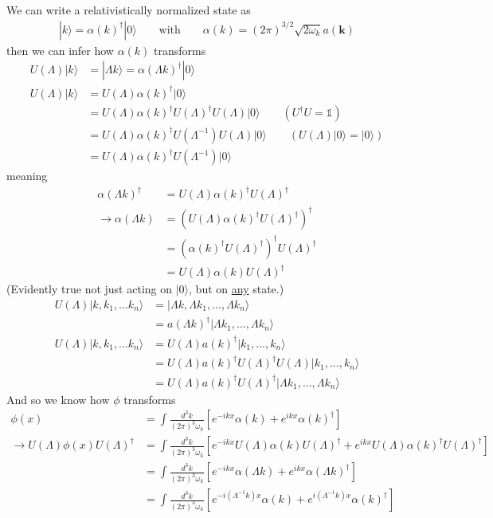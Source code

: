 \documentclass{article}
\begin{document}
We can write a relativistically normalized state as
\begin{align}
|k\rangle=\alpha(k)^\dagger |0\rangle\qquad\text{with}\qquad\alpha(k)=(2\pi)^{3/2}\sqrt{2\omega_k}a(\mathbf{k})
\end{align}
then we can infer how $\alpha(k)$ transforms
\begin{align}
U(\Lambda)|k\rangle&=|\Lambda k\rangle=\alpha(\Lambda k)^\dagger|0\rangle\\
U(\Lambda)|k\rangle
&=U(\Lambda)\alpha(k)^\dagger|0\rangle\\
&=U(\Lambda)\alpha(k)^\dagger U(\Lambda)^\dagger U(\Lambda)|0\rangle\qquad(U^\dagger U=\mathbb{1})\\
&=U(\Lambda)\alpha(k)^\dagger U(\Lambda^{-1})U(\Lambda)|0\rangle\qquad (U(\Lambda)|0\rangle=|0\rangle)\\
&=U(\Lambda)\alpha(k)^\dagger U(\Lambda^{-1})|0\rangle
\end{align}
meaning
\begin{align}
\alpha(\Lambda k)^\dagger
&=U(\Lambda)\alpha(k)^\dagger U(\Lambda)^\dagger\\
\rightarrow\alpha(\Lambda k)
&=(U(\Lambda)\alpha(k)^\dagger U(\Lambda)^\dagger)^\dagger\\
&=(\alpha(k)^\dagger U(\Lambda)^\dagger)^\dagger U(\Lambda)^\dagger\\
&=U(\Lambda) \alpha(k) U(\Lambda)^\dagger
\end{align}
(Evidently true not just acting on $|0\rangle$, but on \underline{any} state.) 
\begin{align}
U(\Lambda)|k,k_1,...k_n\rangle
&=|\Lambda k,\Lambda k_1,...,\Lambda k_n\rangle\\
&=a(\Lambda k)^\dagger|\Lambda k_1,...,\Lambda k_n\rangle\\
U(\Lambda)|k,k_1,...k_n\rangle
&=U(\Lambda)a(k)^\dagger|k_1,...,k_n\rangle\\
&=U(\Lambda)a(k)^\dagger U(\Lambda)^\dagger U(\Lambda)|k_1,...,k_n\rangle\\
&=U(\Lambda)a(k)^\dagger U(\Lambda)^\dagger|\Lambda k_1,...,\Lambda k_n\rangle
\end{align}
And so we know how $\phi$ transforms
\begin{align}
\phi(x)&=\int\frac{d^3k}{(2\pi)^3\omega_k}\left[e^{-ikx}\alpha(k)+e^{ikx}\alpha(k)^\dagger\right]\\
\rightarrow U(\Lambda)\phi(x)U(\Lambda)^\dagger
&=\int\frac{d^3k}{(2\pi)^3\omega_k}\left[e^{-ikx}U(\Lambda)\alpha(k)U(\Lambda)^\dagger+e^{ikx}U(\Lambda)\alpha(k)^\dagger U(\Lambda)^\dagger\right]\\
&=\int\frac{d^3k}{(2\pi)^3\omega_k}\left[e^{-ikx}\alpha(\Lambda k)+e^{ikx}\alpha(\Lambda k)^\dagger \right]\\
&=\int\frac{d^3k}{(2\pi)^3\omega_k}\left[e^{-i(\Lambda^{-1} k)x}\alpha(k)+e^{i(\Lambda^{-1} k)x}\alpha(k)^\dagger \right]
\end{align}
\end{document}
